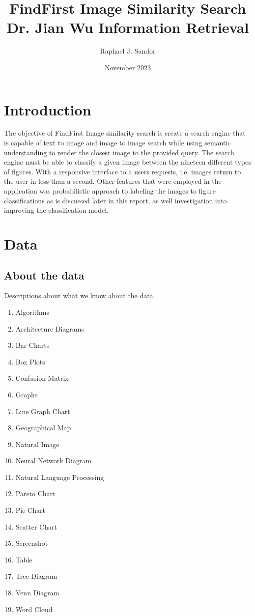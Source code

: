 \documentclass[article, 10pt]{article}
\title{FindFirst Image Similarity Search \\ \large Dr. Jian Wu  Information Retrieval}
\author{Raphael J. Sandor }
\date{November 2023}
\begin{document}
\maketitle

\section{Introduction}
The objective of FindFirst Image similarity search is create a search engine that is capable of text to image 
and image to image search while using semantic understanding to render the closest image to the provided query. 
The search engine must be able to classify a given image between the nineteen different types of figures.
With a responsive interface to a users requests, i.e. images return to the user in less than a second. 
Other features that were employed in the application was probabilistic approach to labeling the images to figure
classifications as is discussed later in this report, as well investigation into improving the classification model. 


\section{Data}
\subsection{About the data}
Descriptions about what we know about the data.
\begin{enumerate}
    \item Algorithms
    \item Architecture Diagrams 
    \item Bar Charts 
    \item Box Plots 
    \item Confusion Matrix
    \item Graphs
    \item Line Graph Chart
    \item Geographical Map
    \item Natural Image
    \item Neural Network Diagram 
    \item Natural Language Processing 
    \item Pareto Chart 
    \item Pie Chart 
    \item Scatter Chart 
    \item Screenshot 
    \item Table 
    \item Tree Diagram 
    \item Venn Diagram 
    \item Word Cloud 
\end{enumerate}
\end{document}
